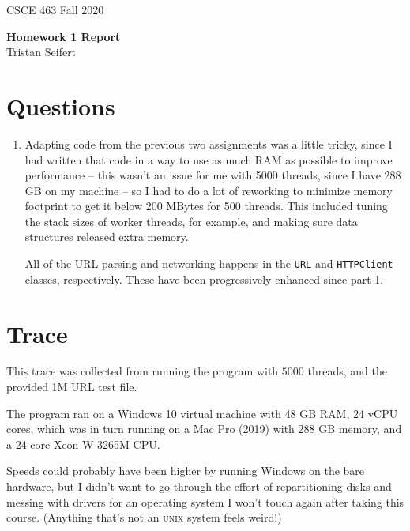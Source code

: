 \documentclass[11pt]{article}
\begin{document}
\newcommand{\answer}[1]{\mbox{~}}

{
\large  CSCE 463 \hfill Fall 2020\\
 \begin{center}
   \textbf{Homework 1 Report} \\
   Tristan Seifert \\
    \end{center}
}

\section{Questions}

\begin{enumerate}

\item {
Adapting code from the previous two assignments was a little tricky, since I had written that code in a way to use as much RAM as possible to improve performance -- this wasn't an issue for me with 5000 threads, since I have 288 GB on my machine -- so I had to do a lot of reworking to minimize memory footprint to get it below 200 MBytes for 500 threads. This included tuning the stack sizes of worker threads, for example, and making sure data structures released extra memory.

All of the URL parsing and networking happens in the \texttt{URL} and \texttt{HTTPClient} classes, respectively. These have been progressively enhanced since part 1.
}

\end{enumerate}

\section{Trace}
This trace was collected from running the program with $5000$ threads, and the provided 1M URL test file.  

The program ran on a Windows 10 virtual machine with 48 GB RAM, 24 vCPU cores, which was in turn running on a Mac Pro (2019) with 288 GB memory, and a 24-core Xeon W-3265M CPU. 

Speeds could probably have been higher by running Windows on the bare hardware, but I didn't want to go through the effort of repartitioning disks and messing with drivers for an operating system I won't touch again after taking this course. (Anything that's not an \textsc{unix} system feels weird!)
\end{document}
